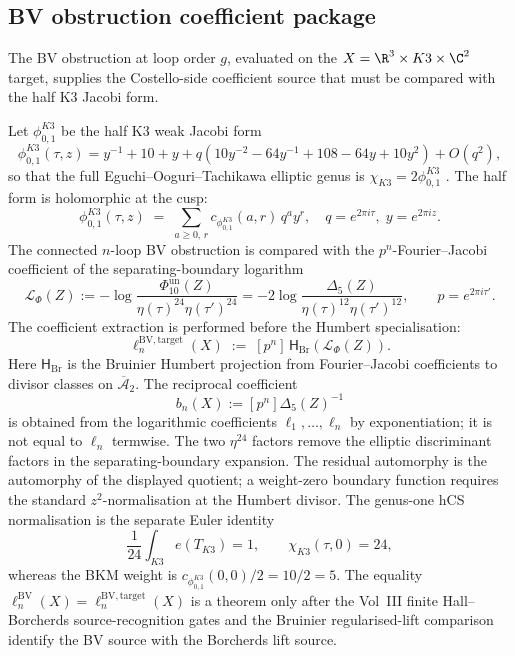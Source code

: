 \subsection{BV obstruction coefficient package}
\label{subsec:hcs-bv-obstruction}

The BV obstruction at loop order $g$, evaluated on the
$X = \R^{3}\times K3\times\C^{2}$ target, supplies the Costello-side
coefficient source that must be compared with the half K3 Jacobi form.

\begin{proposition}
\label{prop:hcs-obstruction-jacobi}
Let \(\phi_{0,1}^{K3}\) be the half K3 weak Jacobi form
\[
\phi_{0,1}^{K3}(\tau,z)=y^{-1}+10+y
 +q(10y^{-2}-64y^{-1}+108-64y+10y^2)+O(q^2),
\]
so that the full Eguchi--Ooguri--Tachikawa elliptic genus is
\(\chi_{K3}=2\phi_{0,1}^{K3}\) \cite{EOT11}. The half form is
holomorphic at the cusp:
\[
 \phi_{0,1}^{K3}(\tau,z)
 \;=\;
 \sum_{a\ge 0,\,r}c_{\phi_{0,1}^{K3}}(a,r)\,q^{a}y^{r},
 \quad q = e^{2\pi i\tau},\; y = e^{2\pi i z}.
\]
The connected $n$-loop BV obstruction is compared with the
\(p^n\)-Fourier--Jacobi coefficient of the separating-boundary logarithm
\[
\mathcal L_{\Phi}(Z)
:=
-\log\frac{\Phi_{10}^{\mathrm{un}}(Z)}
{\eta(\tau)^{24}\eta(\tau')^{24}}
=
-2\log\frac{\Delta_5(Z)}
{\eta(\tau)^{12}\eta(\tau')^{12}},
\qquad p=e^{2\pi i\tau'} .
\]
The coefficient extraction is performed before the Humbert
specialisation:
\begin{equation}\label{eq:bv-obstruction-jacobi-matching}
 \ell_{n}^{\mathrm{BV,target}}(X)
 \;:=\;
 [p^n]\,\mathsf H_{\mathrm{Br}}\!\left(\mathcal L_{\Phi}(Z)\right).
\end{equation}
Here \(\mathsf H_{\mathrm{Br}}\) is the Bruinier Humbert projection from
Fourier--Jacobi coefficients to divisor classes on \(\overline{\mathcal A}_2\).
The reciprocal coefficient
\[
b_n(X):=[p^n]\Delta_5(Z)^{-1}
\]
is obtained from the logarithmic coefficients
\(\ell_1,\ldots,\ell_n\) by exponentiation; it is not equal to
\(\ell_n\) termwise.
The two $\eta^{24}$ factors remove the elliptic discriminant factors in
the separating-boundary expansion. The residual automorphy is the
automorphy of the displayed quotient; a weight-zero boundary function
requires the standard \(z^2\)-normalisation at the Humbert divisor.
The genus-one hCS normalisation is the separate Euler identity
\[
\frac1{24}\int_{K3}e(T_{K3})=1,\qquad
\chi_{K3}(\tau,0)=24,
\]
whereas the BKM weight is
\(c_{\phi_{0,1}^{K3}}(0,0)/2=10/2=5\). The equality
\(\ell_{n}^{\mathrm{BV}}(X)=\ell_{n}^{\mathrm{BV,target}}(X)\) is a theorem
only after the Vol~III finite Hall--Borcherds source-recognition gates
and the Bruinier regularised-lift comparison identify the BV source
with the Borcherds lift source.
\end{proposition}

